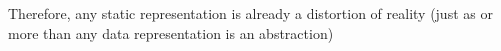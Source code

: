 Therefore, any static representation is already a distortion of reality (just as or more than any data representation is an abstraction) \cite{McQueenBaker2019} %



